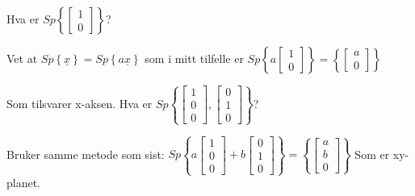 \documentclass[11pt, a4paper, norsk]{article}
\begin{document}
        \begin{Example}{}{}
            Hva er $Sp\left\{\begin{bmatrix}
                                1 \\
                                0
                            \end{bmatrix}\right\}$?

                            Vet at $Sp\left\{\underline{x}\right\} = Sp\left\{a\underline{x}\right\}$ som i mitt tilfelle er $Sp\left\{a \begin{bmatrix}
                                            1 \\
                                            0
                                        \end{bmatrix}\right\} = \left\{\begin{bmatrix}
                                                                            a \\
                                                                            0
                                                                        \end{bmatrix}\right\}$

            Som tilsvarer x-aksen.
            Hva er $Sp\left\{\begin{bmatrix}
                1 \\
                0 \\
                0
            \end{bmatrix}, \begin{bmatrix}
                0 \\
                1 \\
                0
            \end{bmatrix}\right\}$?

            Bruker samme metode som sist:
            $Sp\left\{a \begin{bmatrix}
                1 \\
                0 \\
                0
            \end{bmatrix} + b \begin{bmatrix}
                0 \\
                1 \\
                0
            \end{bmatrix}\right\} = \left\{\begin{bmatrix}
                a \\
                b \\
                0
            \end{bmatrix}\right\}$
            Som er xy-planet.
        \end{Example}
\end{document}
